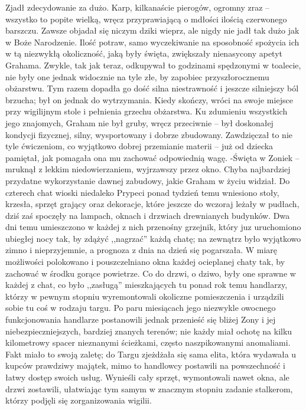 \documentclass[../MAIN.tex]{subfiles}
\begin{document}
Zjadł zdecydowanie za dużo.
Karp, kilkanaście pierogów, ogromny zraz -- wszystko to popite wielką, wręcz przyprawiającą o mdłości ilością czerwonego barszczu. Zawsze objadał się niczym dziki wieprz, ale nigdy nie jadł tak dużo jak w Boże Narodzenie. Ilość potraw, samo wyczekiwanie na sposobność spożycia ich w tą niezwykłą okoliczność, jaką były święta, zwiększały nienasycony apetyt Grahama. Zwykle, tak jak teraz, odkupywał to godzinami spędzonymi w toalecie, nie były one jednak widocznie na tyle złe, by zapobiec przyszłorocznemu obżarstwu. Tym razem dopadła go dość silna niestrawność i jeszcze silniejszy ból brzucha; był on jednak do wytrzymania.
Kiedy skończy, wróci na swoje miejsce przy wigilijnym stole i pełnienia grzechu obżarstwa. Ku zdumieniu wszystkich jego znajomych, Graham nie był gruby, wręcz przeciwnie -- był doskonałej kondycji fizycznej, silny, wysportowany i dobrze zbudowany. Zawdzięczał to nie tyle ćwiczeniom, co wyjątkowo dobrej przemianie materii -- już od dziecka pamiętał, jak pomagała ona mu zachować odpowiednią wagę.
-Święta w Zonie\3k -- mruknął z lekkim niedowierzaniem, wyjrzawszy przez okno.
Chyba najbardziej przydatne wykorzystanie dawnej zabudowy, jakie Graham w życiu widział.
Do czterech chat wioski niedaleko Prypeci ponad tydzień temu wniesiono stoły, krzesła, sprzęt grający oraz dekoracje, które jeszcze do wczoraj leżały w pudłach, dziś zaś spoczęły na lampach, oknach i drzwiach drewnianych budynków.
Dwa dni temu umieszczono w każdej z nich przenośny grzejnik, który juz uruchomiono ubiegłej nocy tak, by zdążyć ,,nagrzać'' każdą chatę; na zewnątrz było wyjątkowo zimno i nieprzyjemnie, a prognoza z dnia na dzień się pogarszała. W miarę możliwości polokowano i pouszczelniano okna każdej ocieplanej chaty tak, by zachować w środku gorące powietrze. Co do drzwi, o dziwo, były one sprawne w każdej z chat, co było ,,zasługą'' mieszkających tu ponad rok temu handlarzy, którzy w pewnym stopniu wyremontowali okoliczne pomieszczenia i urządzili sobie tu coś w rodzaju targu. Po paru miesiącach jego niezwykle owocnego funkcjonowania handlarze postanowili jednak przenieść się bliżej Zony i jej niebezpieczniejszych, bardziej znanych terenów; nie każdy miał ochotę na kilku kilometrowy spacer nieznanymi ścieżkami, często naszpikowanymi anomaliami. Fakt miało to swoją zaletę; do Targu zjeżdżała się sama elita, która wydawała u kupców prawdziwy majątek, mimo to handlowcy postawili na powszechność i łatwy dostęp swoich usług.
Wynieśli cały sprzęt, wymontowali nawet okna, ale drzwi zostawili, ułatwiając tym samym w znacznym stopniu zadanie stalkerom, którzy podjęli się zorganizowania wigilii.
\end{document}
